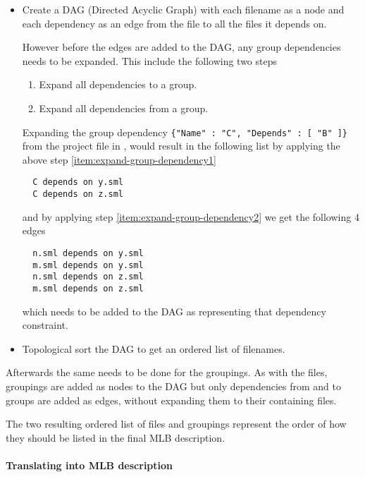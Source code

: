 \begin{itemize}
\item Create a DAG (Directed Acyclic Graph) with each filename as a node and
  each dependency as an edge from the file to all the files it depends on.

  
  However before the edges are added to the DAG, any group dependencies needs to
  be expanded. This include the following two steps
  
  \begin{enumerate}
  \item \label{item:expand-group-dependency1} Expand all dependencies to a
    group.
  \item \label{item:expand-group-dependency2} Expand all dependencies from a
    group.
  \end{enumerate}
  
  Expanding the group dependency \texttt{\{"Name" : "C", "Depends" : [ "B" ]\}}
  from the project file in ,
  would result in the following list by applying the above step
  \ref{item:expand-group-dependency1}
  
\begin{lstlisting}
  C depends on y.sml
  C depends on z.sml
\end{lstlisting}
  
  and by applying step \ref{item:expand-group-dependency2} we get the following
  4 edges
  
\begin{lstlisting}
  n.sml depends on y.sml
  m.sml depends on y.sml
  n.sml depends on z.sml
  m.sml depends on z.sml
\end{lstlisting}
  
  which needs to be added to the DAG as representing that dependency constraint.
  
\item Topological sort the DAG to get an ordered list of filenames.
\end{itemize}

Afterwards the same needs to be done for the groupings. As with the files,
groupings are added as nodes to the DAG but only dependencies from and to groups
are added as edges, without expanding them to their containing files.


The two resulting ordered list of files and groupings represent the order of how
they should be listed in the final MLB description.


\paragraph{Translating into MLB description}
\label{sec:translating-into-mlb}

